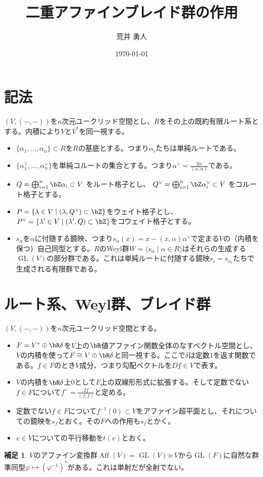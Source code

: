 \documentclass[uplatex, a4paper, dvipdfmx]{jsarticle}
\title{二重アファインブレイド群の作用}
\author{荒井 勇人}
\date{\today}
\theoremstyle{definition}
\newtheorem{remark}[theorem]{補足}
\DeclareMathOperator{\GL}{\mathrm{GL}}
\DeclareMathOperator{\Aff}{\mathrm{Aff}}
\begin{document}
\maketitle


\section{記法}
$(V,(-, -))$を$n$次元ユークリッド空間とし、$R$をその上の既約有限ルート系とする。内積により$V$と$V^*$を同一視する。
\begin{itemize}
    \item $\{\alpha_1, \dots, \alpha_n\} \subset R$を$R$の基底とする。つまり$\alpha_i$たちは単純ルートである。
    \item $\{\alpha_1^\vee, \dots, \alpha_n^\vee\}$を単純コルートの集合とする。つまり$\alpha^\vee = \frac{2\alpha}{(\alpha, \alpha)}$である。
    \item $Q = \bigoplus_{i = 1}^n \bZ \alpha_i \subset V$ をルート格子とし、 $Q^\vee = \bigoplus_{i = 1}^n \bZ \alpha_i^\vee \subset V$ をコルート格子とする。
    \item $P = \{\lambda \in V \mid (\lambda, Q^\vee) \subset \bZ\}$をウェイト格子とし、$P^\vee = \{\lambda' \in V \mid (\lambda', Q) \subset \bZ\}$をコウェイト格子とする。
    \item $s_\alpha$を$\alpha$に付随する鏡映、つまり$s_\alpha(x) = x - (x, \alpha)\alpha^\vee$で定まる$V$の（内積を保つ）自己同型とする。$R$のWeyl群$W = \langle s_\alpha \mid \alpha \in R \rangle$はそれらの生成する$\GL(V)$の部分群である。これは単純ルートに付随する鏡映$s_i = s_{\alpha_i}$たちで生成される有限群である。
\end{itemize}
\section{ルート系、Weyl群、ブレイド群}
$(V,(-, -))$を$n$次元ユークリッド空間とする。
\begin{itemize}
    \item $F = V^* \oplus \bR \delta$を$V$上の$\bR$値アファイン関数全体のなすベクトル空間とし、$V$の内積を使って$F \cong V \oplus \bR \delta$と同一視する。ここで$\delta$は定数$1$を返す関数である。$f \in F$のとき$V$成分、つまり勾配ベクトルを$Df \in V$で表す。
    \item $V$の内積を$\bR \delta$上$0$として$F$上の双線形形式に拡張する。そして定数でない$f \in F$について$f^\vee = \frac{2f}{(f, f)}$と定める。
    \item 定数でない$f \in F$について$f^{-1}(0) \subset V$をアファイン超平面とし、それについての鏡映を$s_f$とおく。その$F$への作用も$s_f$とかく。
    \item $v \in V$についての平行移動を$t(v)$とおく。
\end{itemize}
\begin{remark}
    $V$のアファイン変換群$\Aff(V) = \GL(V) \ltimes V$から$\GL(F)$に自然な群準同型$\varphi \mapsto (\varphi^{-1})^*$がある。これは単射だが全射でない。
\end{remark}
\end{document}
